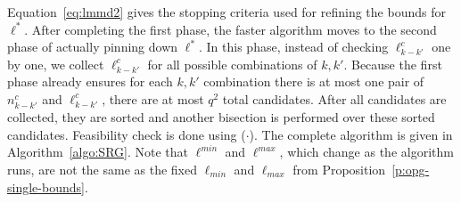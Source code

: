 Equation~\eqref{eq:lmmd2} gives the stopping criteria used for refining 
the bounds for $\ell^*$. After completing the first phase, the faster algorithm
moves to the second phase of actually pinning down $\ell^*$. In this phase, 
instead of checking $\ell_{k-k'}^c$ one by one, we collect $\ell_{k-k'}^c$ for
all possible combinations of $k, k'$. Because the first phase already ensures
for each $k, k'$ combination there is at most one pair of $n_{k-k'}^c$ and 
$\ell_{k-k'}^c$, there are 
at most $q^2$ total candidates. After all candidates are collected, they are 
sorted and another bisection is performed over these sorted candidates. 
Feasibility check is done using \isLFeasibleByTilingPartial($\cdot$). The 
complete algorithm is given in Algorithm~\ref{algo:SRG}. Note that 
$\ell^{min}$ and $\ell^{max}$, which change as the algorithm runs, are not 
the same as the fixed $\ell_{min}$ and $\ell_{max}$ from 
Proposition~\ref{p:opg-single-bounds}. 
\newpage
\vspace*{-7mm}
